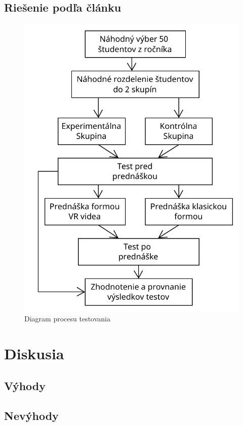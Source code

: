\documentclass[10pt,oneside,slovak,a4paper]{article}
\begin{document}
\subsection{Riešenie podľa článku}\label{riesenia:2}

\begin{figure}[!b]
	\begin{center}
	\includegraphics[scale=0.4]{diagram.pdf}
	\caption{Diagram procesu testovania}
	\end{center}
\end{figure}
\section{Diskusia}\label{diskusia}
\subsection{Výhody}\label{diskusia:1}

\subsection{Nevýhody}\label{diskusia:2}

\end{document}
